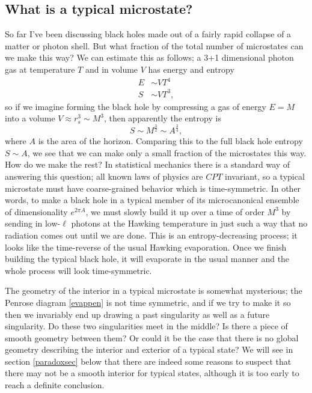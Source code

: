 \documentclass[12pt]{article}
\newcommand{\be}{\begin{equation}}
\newcommand{\ee}{\end{equation}}
\begin{document}
\subsection{What is a typical microstate?}\label{typicalsec}
So far I've been discussing black holes made out of a fairly rapid collapse of a matter or photon shell.  But what fraction of the total number of microstates can we make this way?  We can estimate this as follows; a 3+1 dimensional photon gas at temperature $T$ and in volume $V$ has energy and entropy
\begin{align}\nonumber
E&\sim V T^4\\
S&\sim VT^3,
\end{align}
so if we imagine forming the black hole by compressing a gas of energy $E=M$ into a volume $V\approx r_s^3\sim M^3$, then apparently the entropy is
\be
S\sim M^{\frac{3}{2}}\sim A^{\frac{3}{4}},  
\ee
where $A$ is the area of the horizon.  Comparing this to the full black hole entropy $S\sim A$, we see that we can make only a small fraction of the microstates this way.  How do we make the rest?  In statistical mechanics there is a standard way of answering this question; all known laws of physics are $CPT$ invariant, so a typical microstate must have coarse-grained behavior which is time-symmetric.  In other words, to make a black hole in a typical member of its microcanonical ensemble of dimensionality $e^{2\pi A}$, we must slowly build it up over a time of order $M^3$ by sending in low-$\ell$ photons at the Hawking temperature in just such a way that no radiation comes out until we are done.  This is an entropy-decreasing process; it looks like the time-reverse of the usual Hawking evaporation.  Once we finish building the typical black hole, it will evaporate in the usual manner and the whole process will look time-symmetric.  

The geometry of the interior in a typical microstate is somewhat mysterious; the Penrose diagram \ref{evappen} is not time symmetric, and if we try to make it so then we invariably end up drawing a past singularity as well as a future singularity.  Do these two singularities meet in the middle?  Is there a piece of smooth geometry between them?  Or could it be the case that there is no global geometry describing the interior and exterior of a typical state?  We will see in section \ref{paradoxsec} below that there are indeed some reasons to suspect that there may not be a smooth interior for typical states, although it is too early to reach a definite conclusion.
\end{document}
